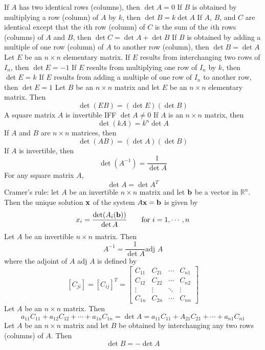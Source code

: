 \documentclass{article}
\begin{document}
\begin{outline}
                \2 If $A$ has two identical rows (columns), then \(\det A=0\)
                \2 If $B$ is obtained by multiplying a row (column) of $A$ by $k$, then \(\det B=k\det A\)
                \2 If $A$, $B$, and $C$ are identical except that the $i$th row (column) of $C$ is the sum of the $i$th rows (columns) of \(A\) and \(B\), then \(\det C=\det A+\det B\)
                \2 If $B$ is obtained by adding a multiple of one row (column) of $A$ to another row (column), then \(\det B=\det A\)
            \1 Let $E$ be an \(n\times n\) elementary matrix. 
                \2 If \(E\) results from interchanging two rows of $I_n$, then \(\det E=-1\)
                \2 If \(E\) results from multiplying one row of \(I_n\) by \(k\), then \(\det E=k\)
                \2 If \(E\) results from adding a multiple of one row of \(I_n\) to another row, then \(\det E=1\)
            \1 Let \(B\) be an \(n\times n\) matrix and let \(E\) be an \(n\times n\) elementary matrix. Then \[\det (EB)=(\det E)(\det B)\]
            \1 A square matrix \(A\) is invertible IFF \(\det A\neq 0\)
            \1 If \(A\) is an \(n\times n\) matrix, then \[\det (kA)=k^n\det A\]
            \1 If $A$ and $B$ are \(n\times n\) matrices, then \[\det (AB)=(\det A)(\det B)\]
            \1 If \(A\) is invertible, then \[\det (A^{-1})=\dfrac{1}{\det A}\]
            \1 For any square matrix $A$, \[\det A=\det A^T\]
            \1 Cramer's rule: let $A$ be an invertible \(n\times n\) matrix and let \(\vb b\) be a vector in \(\mathbb R^n\). Then the unique solution \(\vb x\) of the system \(A\vb x=\vb b\) is given by \[x_i=\dfrac{\det (A_i(\vb b))}{\det A}\qquad\text{for }i=1,\cdots,n\]
            \1 Let \(A\) be an invertible \(n\times n\) matrix. Then \[A^{-1}=\dfrac{1}{\det A}\text{adj }A\] where the adjoint of $A$ adj $A$ is defined by \[[C_{ji}]=[C_{ij}]^T=\begin{bmatrix}
                C_{11} & C_{21} & \cdots & C_{n1} \\ C_{12} & C_{22} & \cdots & C_{n2} \\ \vdots & \vdots & \ddots & \vdots \\ C_{1n} & C_{2n} & \cdots & C_{nn}
            \end{bmatrix}\]
            \1 Let $A$ be an \(n\times n\) matrix. Then \[a_{11}C_{11}+a_{12}C_{12}+\cdots+a_{1n}C_{1n}=\det A=a_{11}C_{11}+A_{21}C_{21}+\cdots+a_{n1}C_{n1}\]
            \1 Let $A$ be an \(n\times n\) matrix and let $B$ be obtained by interchanging any two rows (columns) of $A$. Then \[\det B=-\det A\]
        \end{outline}
\end{document}
